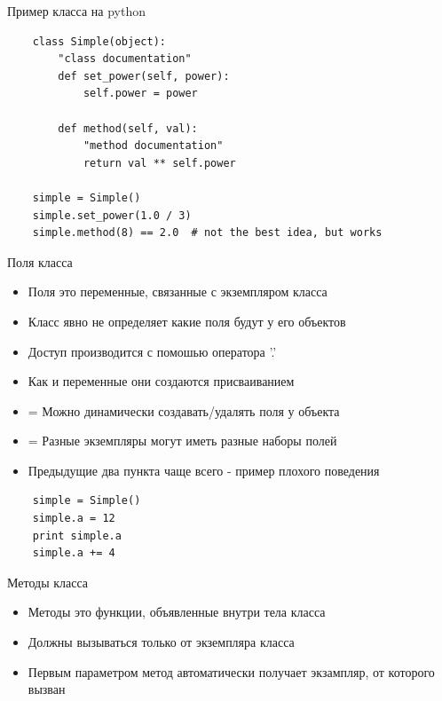 \documentclass{article}
\begin{document}
\begin{center} Пример класса на python \end{center}
\vspace{15pt}
\begin{lstlisting}
    class Simple(object):
        "class documentation"
        def set_power(self, power):
            self.power = power

        def method(self, val):
            "method documentation"
            return val ** self.power

    simple = Simple()
    simple.set_power(1.0 / 3)
    simple.method(8) == 2.0  # not the best idea, but works
\end{lstlisting}
\newpage

\begin{center} Поля класса \end{center}
\begin{itemize}
    \item Поля это переменные, связанные с экземпляром класса
    \item Класс явно не определяет какие поля будут у его объектов
    \item Доступ производится с помошью оператора '.'
    \item Как и переменные они создаются присваиванием
    \item = Можно динамически создавать/удалять поля у объекта
    \item = Разные экземпляры могут иметь разные наборы полей
    \item Предыдущие два пункта чаще всего - пример плохого поведения
\end{itemize}
\begin{lstlisting}
    simple = Simple()
    simple.a = 12
    print simple.a
    simple.a += 4
\end{lstlisting}
\newpage

\begin{center} Методы класса\end{center}
\begin{itemize}
    \item Методы это функции, объявленные внутри тела класса
    \item Должны вызываться только от экземпляра класса
    \item Первым параметром метод автоматически получает экзампляр, от которого вызван
\end{itemize}
\end{document}
